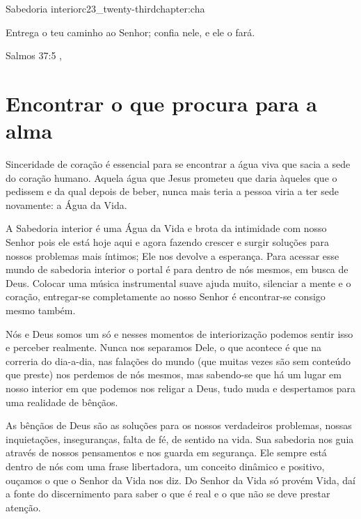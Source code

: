 \begin{chapterpage}{Sabedoria interior}{c23_twenty-thirdchapter:cha}

\begin{myquotation}Entrega o teu caminho ao Senhor; confia nele, e ele o fará.

\par\vspace*{15mm}
\mbox{}\hfill \emdash{}Salmos 37:5 
, %
\par\end{myquotation}

\end{chapterpage}



\section{Encontrar o que procura para a alma}\label{c1_basicformatting:sec}

\emdash{}Sinceridade de coração é essencial para se encontrar a água viva que sacia a sede do coração humano. Aquela água que Jesus prometeu que daria àqueles que o pedissem e da qual depois de beber, nunca mais teria a pessoa viria a ter sede novamente: a Água da Vida. 

\emdash{}A Sabedoria interior é uma Água da Vida e brota da intimidade com nosso Senhor pois ele está hoje aqui e agora fazendo crescer e surgir soluções para nossos problemas mais íntimos; Ele nos devolve a esperança. Para acessar esse mundo de sabedoria interior o portal é para dentro de nós mesmos, em busca de Deus. Colocar uma música instrumental suave ajuda muito, silenciar a mente e o coração, entregar-se completamente ao nosso Senhor é encontrar-se consigo mesmo também.

\emdash{}Nós e Deus somos um só e nesses momentos de interiorização podemos sentir isso e perceber realmente. Nunca nos separamos Dele, o que acontece é que na correria do dia-a-dia, nas falações do mundo (que muitas vezes são sem conteúdo que preste) nos perdemos de nós mesmos, mas sabendo-se que há um lugar em nosso interior em que podemos nos religar a Deus, tudo muda e despertamos para uma realidade de bênçãos.

\emdash{}As bênçãos de Deus são as soluções para os nossos verdadeiros problemas, nossas inquietações, inseguranças, falta de fé, de sentido na vida. Sua sabedoria nos guia através de nossos pensamentos e nos guarda em segurança. Ele sempre está dentro de nós com uma frase libertadora, um conceito dinâmico e positivo, ouçamos o que o Senhor da Vida nos diz. Do Senhor da Vida só provém Vida, daí a fonte do discernimento para saber o que é real e o que não se deve prestar atenção.

